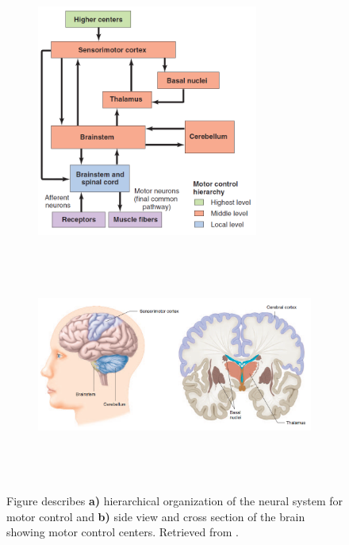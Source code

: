 \begin{figure}[t!]
    \centering
    \begin{subfigure}[t]{0.95\textwidth}
        \centering
        \includegraphics[height=3in]{Images/introduction/control.png}
        \caption{}
    \end{subfigure}%
    
    \begin{subfigure}[t]{0.95\textwidth}
        \centering
        \includegraphics[height=3in]{Images/introduction/control2.png}
        \caption{}
    \end{subfigure}
    \caption{Figure describes \textbf{a)} hierarchical organization of the neural system for motor control and \textbf{b)} side view and cross section of the brain showing motor control centers. Retrieved from \citet{Widmaier2014}.}
\label{fig:brain_centers}
\end{figure}

